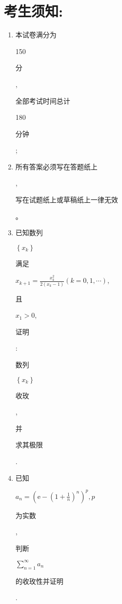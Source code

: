 \documentclass[10pt]{article}
\begin{document}
\section{考生须知:}
\begin{enumerate}
  \item \begin{CJK}{UTF8}{mj}本试卷满分为\end{CJK} 150 \begin{CJK}{UTF8}{mj}分\end{CJK}, \begin{CJK}{UTF8}{mj}全部考试时间总计\end{CJK} 180 \begin{CJK}{UTF8}{mj}分钟\end{CJK};

  \item \begin{CJK}{UTF8}{mj}所有答案必须写在答题纸上\end{CJK}, \begin{CJK}{UTF8}{mj}写在试题纸上或草稿纸上一律无效\end{CJK}。

  \item \begin{CJK}{UTF8}{mj}已知数列\end{CJK} $\left\{x_{k}\right\}$ \begin{CJK}{UTF8}{mj}满足\end{CJK} $x_{k+1}=\frac{x_{k}^{2}}{2\left(x_{k}-1\right)}(k=0,1, \cdots)$, \begin{CJK}{UTF8}{mj}且\end{CJK} $x_{1}>0$, \begin{CJK}{UTF8}{mj}证明\end{CJK}: \begin{CJK}{UTF8}{mj}数列\end{CJK} $\left\{x_{k}\right\}$ \begin{CJK}{UTF8}{mj}收玫\end{CJK}, \begin{CJK}{UTF8}{mj}并\end{CJK} \begin{CJK}{UTF8}{mj}求其极限\end{CJK}.

  \item \begin{CJK}{UTF8}{mj}已知\end{CJK} $a_{n}=\left(\mathrm{e}-\left(1+\frac{1}{n}\right)^{n}\right)^{p}, p$ \begin{CJK}{UTF8}{mj}为实数\end{CJK}, \begin{CJK}{UTF8}{mj}判断\end{CJK} $\sum_{n=1}^{\infty} a_{n}$ \begin{CJK}{UTF8}{mj}的收玫性并证明\end{CJK}.


\end{enumerate}
\end{document}
